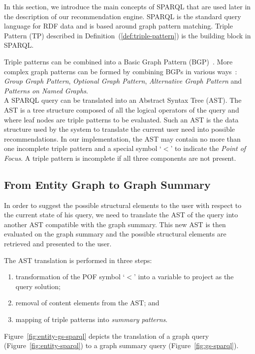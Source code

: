 In this section, we introduce the main concepts of SPARQL that are used later in the description of our recommendation engine. SPARQL is the standard query language for RDF data and is based around graph pattern matching. Triple Pattern (TP) described in Definition~(\ref{def:triple-pattern}) is the building block in SPARQL.

Triple patterns can be combined into a Basic Graph Pattern (BGP)~\cite{PrudS08}. More complex graph patterns can be formed by combining BGPs in various ways~\cite{PrudS08}: \emph{Group Graph Pattern}, \emph{Optional Graph Pattern}, \emph{Alternative Graph Pattern} and \emph{Patterns on Named Graphs}.\\

A SPARQL query can be translated into an Abstract Syntax Tree (AST). The AST is a tree structure composed of all the logical operators of the query and where leaf nodes are triple patterns to be evaluated. Such an AST is the data structure used by the system to translate the current user need into possible recommendations. In our implementation, the AST may contain no more than one incomplete triple pattern and a special symbol `$<$' to indicate the \emph{Point of Focus}. A triple pattern is incomplete if all three components are not present.

\subsection{From Entity Graph to Graph Summary}

In order to suggest the possible structural elements to the user with respect to the current state of his query, we need to translate the AST of the query into another AST compatible with the graph summary. This new AST is then evaluated on the graph summary and the possible structural elements are retrieved and presented to the user.

The AST translation is performed in three steps:
\begin{enumerate}
	\item transformation of the POF symbol `$<$' into a variable to project as the query solution;
	\item removal of content elements from the AST; and
	\item mapping of triple patterns into \emph{summary patterns}.
\end{enumerate}
Figure~\ref{fig:entity-gs-sparql} depicts the translation of a graph query (Figure~\ref{fig:entity-sparql}) to a graph summary query (Figure~\ref{fig:gs-sparql}).

